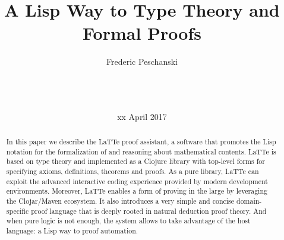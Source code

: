 \documentclass{styles/sig-alternate-05-2015}
\begin{document}





\title{A Lisp Way to Type Theory and Formal Proofs}

%
\author{
%
%
\alignauthor
Frederic Peschanski\\
       \\
       \\
       \\
}
\date{xx April 2017}

\maketitle
\begin{abstract}
  In this paper we describe the LaTTe proof assistant, a
  software that promotes the Lisp notation for the formalization of and reasoning about
  mathematical contents.
  LaTTe is based on type theory and implemented as a Clojure library with top-level forms for specifying axioms,
  definitions, theorems and proofs.
  As a pure library, LaTTe can exploit the advanced interactive coding experience provided by modern
  development environments. Moreover, LaTTe enables a form of proving in the large by leveraging the Clojar/Maven
  ecosystem. It also introduces a very simple and concise domain-specific proof language
  that is deeply rooted in natural deduction proof theory. And when pure logic is not enough, the system
  allows to take advantage of the host language: a Lisp way to proof automation.
\end{abstract}
\end{document}
